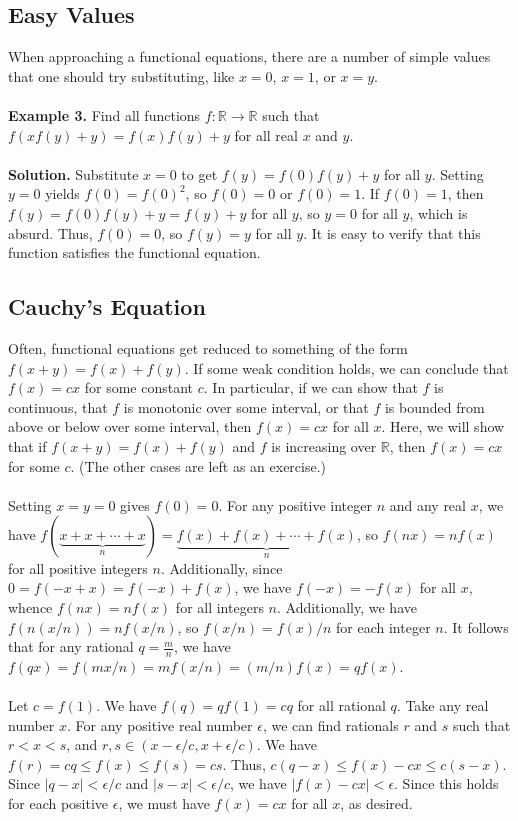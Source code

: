 \documentclass[11pt]{article}
\begin{document}
\subsection{Easy Values}

When approaching a functional equations, there are a number of simple values that one should try substituting, like $x = 0$, $x = 1$, or $x = y$.
\\\\ 
\textbf{Example 3.} Find all functions $f : \mathbb{R} \to \mathbb{R}$ such that $f(xf(y)+y) = f(x)f(y) + y$ for all real $x$ and $y$. 
\\\\
\textbf{Solution.} Substitute $x = 0$ to get $f(y) = f(0)f(y) + y$ for all $y$. Setting $y = 0$ yields $f(0) = f(0)^2$, so $f(0) = 0$ or $f(0) = 1$. If $f(0) = 1$, then $f(y) = f(0)f(y) + y = f(y) + y$ for all $y$, so $y = 0$ for all $y$, which is absurd. Thus, $f(0) = 0$, so $f(y) = y$ for all $y$. It is easy to verify that this function satisfies the functional equation. 

\subsection{Cauchy's Equation}

Often, functional equations get reduced to something of the form $f(x+y) = f(x) + f(y)$. If some weak condition holds, we can conclude that $f(x) = cx$ for some constant $c$. In particular, if we can show that $f$ is continuous, that $f$ is monotonic over some interval, or that $f$ is bounded from above or below over some interval, then $f(x) = cx$ for all $x$. Here, we will show that if $f(x+y) = f(x) + f(y)$ and $f$ is increasing over $\mathbb{R}$, then $f(x) = cx$ for some $c$. (The other cases are left as an exercise.)
\\\\
Setting $x=y=0$ gives $f(0) = 0$. For any positive integer $n$ and any real $x$, we have $f(\underbrace{x + x + \cdots + x}_n) = \underbrace{f(x) + f(x) + \cdots + f(x)}_n$, so $f(nx) = nf(x)$ for all positive integers $n$. Additionally, since $0 = f(-x + x) = f(-x) + f(x)$, we have $f(-x) = -f(x)$ for all $x$, whence $f(nx) = nf(x)$ for all integers $n$. Additionally, we have $f(n(x/n)) = n f(x/n)$, so $f(x/n) = f(x)/n$ for each integer $n$. It follows that for any rational $q = \frac{m}{n}$, we have $f(qx) = f(mx/n) = mf(x/n) = (m/n)f(x) = qf(x)$. 
\\\\
Let $c = f(1)$. We have $f(q) = qf(1) = cq$ for all rational $q$. Take any real number $x$. For any positive real number $\epsilon$, we can find rationals $r$ and $s$ such that $r < x < s$, and $r,s \in (x - \epsilon/c, x + \epsilon/c)$. We have $f(r) = cq \leq f(x) \leq f(s) = cs$. Thus, $c(q - x) \leq f(x) - cx \leq c(s - x)$. Since $|q-x| < \epsilon/c$ and $|s - x| < \epsilon/c$, we have $|f(x) - cx| < \epsilon$. Since this holds for each positive $\epsilon$, we must have $f(x) = cx$ for all $x$, as desired. 
\end{document}

